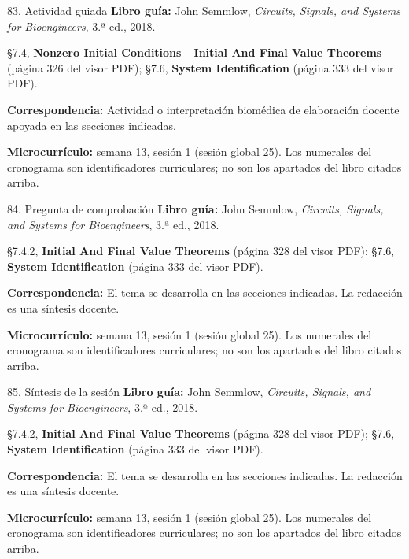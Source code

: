 \documentclass[
  10pt,
  ignorenonframetext,
  aspectratio=169,
  spanish,
]{beamer}
\begin{document}
\begin{frame}{83. Actividad guiada}
\label{actividad-guiada-4}
\textbf{Libro guía:} John Semmlow, \emph{Circuits, Signals, and Systems
for Bioengineers}, 3.ª ed., 2018.

§7.4, \textbf{Nonzero Initial Conditions---Initial And Final Value
Theorems} (página 326 del visor PDF); §7.6, \textbf{System
Identification} (página 333 del visor PDF).

\textbf{Correspondencia:} Actividad o interpretación biomédica de
elaboración docente apoyada en las secciones indicadas.

\textbf{Microcurrículo:} semana 13, sesión 1 (sesión global 25). Los
numerales del cronograma son identificadores curriculares; no son los
apartados del libro citados arriba.
\end{frame}

\begin{frame}{84. Pregunta de comprobación}
\label{pregunta-de-comprobaciuxf3n-4}
\textbf{Libro guía:} John Semmlow, \emph{Circuits, Signals, and Systems
for Bioengineers}, 3.ª ed., 2018.

§7.4.2, \textbf{Initial And Final Value Theorems} (página 328 del visor
PDF); §7.6, \textbf{System Identification} (página 333 del visor PDF).

\textbf{Correspondencia:} El tema se desarrolla en las secciones
indicadas. La redacción es una síntesis docente.

\textbf{Microcurrículo:} semana 13, sesión 1 (sesión global 25). Los
numerales del cronograma son identificadores curriculares; no son los
apartados del libro citados arriba.
\end{frame}

\begin{frame}{85. Síntesis de la sesión}
\label{suxedntesis-de-la-sesiuxf3n-4}
\textbf{Libro guía:} John Semmlow, \emph{Circuits, Signals, and Systems
for Bioengineers}, 3.ª ed., 2018.

§7.4.2, \textbf{Initial And Final Value Theorems} (página 328 del visor
PDF); §7.6, \textbf{System Identification} (página 333 del visor PDF).

\textbf{Correspondencia:} El tema se desarrolla en las secciones
indicadas. La redacción es una síntesis docente.

\textbf{Microcurrículo:} semana 13, sesión 1 (sesión global 25). Los
numerales del cronograma son identificadores curriculares; no son los
apartados del libro citados arriba.
\end{frame}
\end{document}
